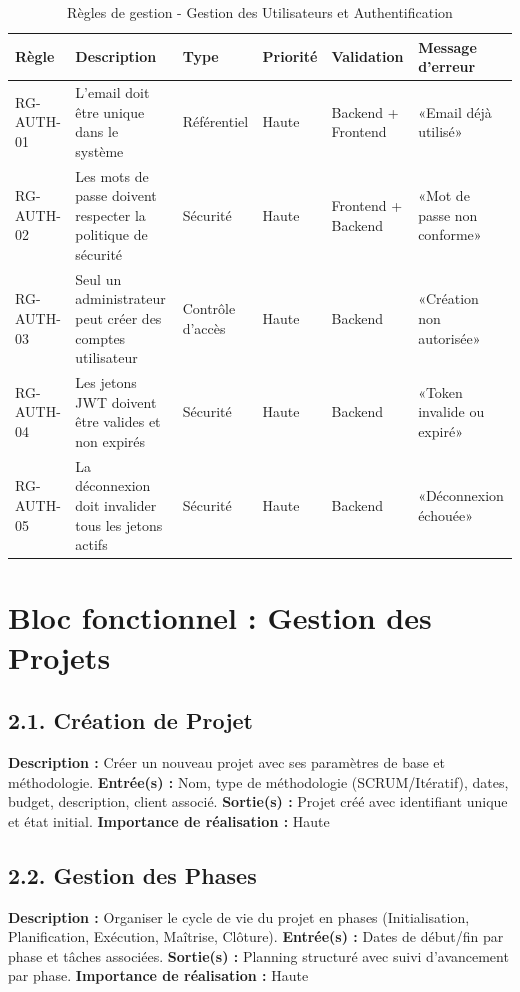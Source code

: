 \begin{table}[H]
\centering
\footnotesize
\begin{tabular}{|p{1.5cm}|p{3.5cm}|p{1.5cm}|p{1.5cm}|p{2cm}|p{2.5cm}|}
\hline
\textbf{Règle} & \textbf{Description} & \textbf{Type} & \textbf{Priorité} & \textbf{Validation} & \textbf{Message d'erreur} \\
\hline
RG-AUTH-01 & L'email doit être unique dans le système & Référentiel & Haute & Backend + Frontend & «Email déjà utilisé» \\
\hline
RG-AUTH-02 & Les mots de passe doivent respecter la politique de sécurité & Sécurité & Haute & Frontend + Backend & «Mot de passe non conforme» \\
\hline
RG-AUTH-03 & Seul un administrateur peut créer des comptes utilisateur & Contrôle d'accès & Haute & Backend & «Création non autorisée» \\
\hline
RG-AUTH-04 & Les jetons JWT doivent être valides et non expirés & Sécurité & Haute & Backend & «Token invalide ou expiré» \\
\hline
RG-AUTH-05 & La déconnexion doit invalider tous les jetons actifs & Sécurité & Haute & Backend & «Déconnexion échouée» \\
\hline
\end{tabular}
\caption{Règles de gestion - Gestion des Utilisateurs et Authentification}
\label{tab:rg_auth}
\end{table}

\section{Bloc fonctionnel : Gestion des Projets}

\subsection{2.1. Création de Projet}
\textbf{Description :} Créer un nouveau projet avec ses paramètres de base et méthodologie.
\textbf{Entrée(s) :} Nom, type de méthodologie (SCRUM/Itératif), dates, budget, description, client associé.
\textbf{Sortie(s) :} Projet créé avec identifiant unique et état initial.
\textbf{Importance de réalisation :} Haute

\subsection{2.2. Gestion des Phases}
\textbf{Description :} Organiser le cycle de vie du projet en phases (Initialisation, Planification, Exécution, Maîtrise, Clôture).
\textbf{Entrée(s) :} Dates de début/fin par phase et tâches associées.
\textbf{Sortie(s) :} Planning structuré avec suivi d'avancement par phase.
\textbf{Importance de réalisation :} Haute

